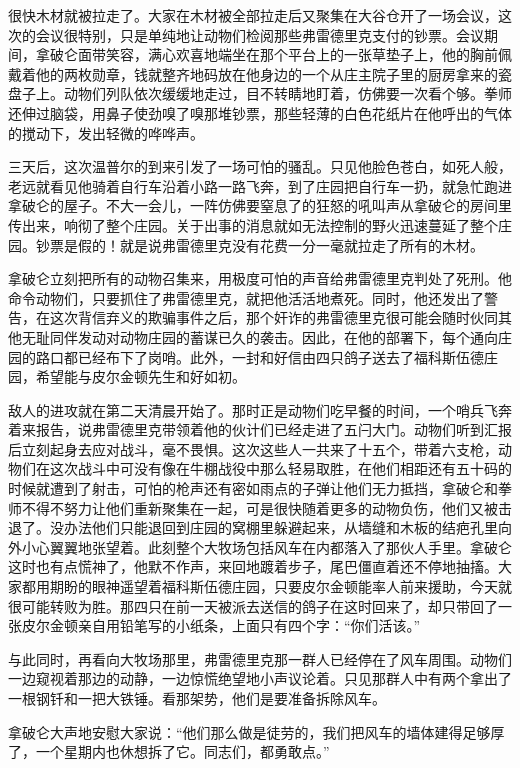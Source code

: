 很快木材就被拉走了。大家在木材被全部拉走后又聚集在大谷仓开了一场会议，这次的会议很特别，只是单纯地让动物们检阅那些弗雷德里克支付的钞票。会议期间，拿破仑面带笑容，满心欢喜地端坐在那个平台上的一张草垫子上，他的胸前佩戴着他的两枚勋章，钱就整齐地码放在他身边的一个从庄主院子里的厨房拿来的瓷盘子上。动物们列队依次缓缓地走过，目不转睛地盯着，仿佛要一次看个够。拳师还伸过脑袋，用鼻子使劲嗅了嗅那堆钞票，那些轻薄的白色花纸片在他呼出的气体的搅动下，发出轻微的哗哗声。

三天后，这次温普尔的到来引发了一场可怕的骚乱。只见他脸色苍白，如死人般，老远就看见他骑着自行车沿着小路一路飞奔，到了庄园把自行车一扔，就急忙跑进拿破仑的屋子。不大一会儿，一阵仿佛要窒息了的狂怒的吼叫声从拿破仑的房间里传出来，响彻了整个庄园。关于出事的消息就如无法控制的野火迅速蔓延了整个庄园。钞票是假的！就是说弗雷德里克没有花费一分一毫就拉走了所有的木材。

拿破仑立刻把所有的动物召集来，用极度可怕的声音给弗雷德里克判处了死刑。他命令动物们，只要抓住了弗雷德里克，就把他活活地煮死。同时，他还发出了警告，在这次背信弃义的欺骗事件之后，那个奸诈的弗雷德里克很可能会随时伙同其他无耻同伴发动对动物庄园的蓄谋已久的袭击。因此，在他的部署下，每个通向庄园的路口都已经布下了岗哨。此外，一封和好信由四只鸽子送去了福科斯伍德庄园，希望能与皮尔金顿先生和好如初。

敌人的进攻就在第二天清晨开始了。那时正是动物们吃早餐的时间，一个哨兵飞奔着来报告，说弗雷德里克带领着他的伙计们已经走进了五闩大门。动物们听到汇报后立刻起身去应对战斗，毫不畏惧。这次这些人一共来了十五个，带着六支枪，动物们在这次战斗中可没有像在牛棚战役中那么轻易取胜，在他们相距还有五十码的时候就遭到了射击，可怕的枪声还有密如雨点的子弹让他们无力抵挡，拿破仑和拳师不得不努力让他们重新聚集在一起，可是很快随着更多的动物负伤，他们又被击退了。没办法他们只能退回到庄园的窝棚里躲避起来，从墙缝和木板的结疤孔里向外小心翼翼地张望着。此刻整个大牧场包括风车在内都落入了那伙人手里。拿破仑这时也有点慌神了，他默不作声，来回地踱着步子，尾巴僵直着还不停地抽搐。大家都用期盼的眼神遥望着福科斯伍德庄园，只要皮尔金顿能率人前来援助，今天就很可能转败为胜。那四只在前一天被派去送信的鸽子在这时回来了，却只带回了一张皮尔金顿亲自用铅笔写的小纸条，上面只有四个字：“你们活该。”

与此同时，再看向大牧场那里，弗雷德里克那一群人已经停在了风车周围。动物们一边窥视着那边的动静，一边惊慌绝望地小声议论着。只见那群人中有两个拿出了一根钢钎和一把大铁锤。看那架势，他们是要准备拆除风车。

拿破仑大声地安慰大家说：“他们那么做是徒劳的，我们把风车的墙体建得足够厚了，一个星期内也休想拆了它。同志们，都勇敢点。”

